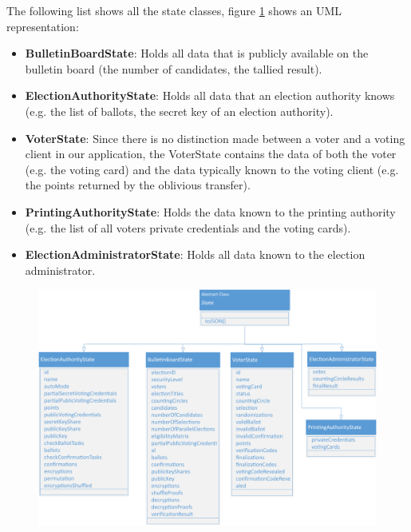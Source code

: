 The following list shows all the state classes, figure \ref{State classes} shows an UML representation:
\begin{itemize}
	\item \textbf{BulletinBoardState}: Holds all data that is publicly available on the bulletin board (the number of candidates, the tallied result).
	\item \textbf{ElectionAuthorityState}: Holds all data that an election authority knows (e.g. the list of ballots, the secret key of an election authority).
	\item \textbf{VoterState}: Since there is no distinction made between a voter and a voting client in our application, the VoterState contains the data of both the voter (e.g. the voting card) and the data typically known to the voting client (e.g. the points returned by the oblivious transfer).
	\item \textbf{PrintingAuthorityState}: Holds the data known to the printing authority (e.g. the list of all voters private credentials and the voting cards).
	\item \textbf{ElectionAdministratorState}: Holds all data known to the election administrator.
\end{itemize}
\begin{figure}
\begin{center}
\includegraphics[scale=0.60]{assets/uml_states.pdf}
\label{State classes}%
\end{center}
\end{figure}

